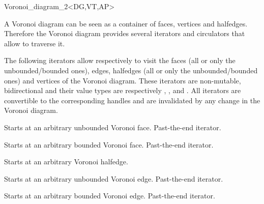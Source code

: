 \begin{ccRefClass}{Voronoi_diagram_2<DG,VT,AP>}


A Voronoi diagram can be seen as a container of faces, vertices and
halfedges. Therefore the Voronoi diagram provides several iterators
and circulators that allow to traverse it.





The following iterators allow respectively to visit the faces (all or
only the unbounded/bounded ones), edges, halfedges (all or only the
unbounded/bounded ones) and vertices of the Voronoi diagram. These
iterators are non-mutable, bidirectional and their 
value types are respectively , ,
 and . All iterators are convertible to the
corresponding handles and are invalidated by any change in the Voronoi
diagram.

\ccGlue
{}

{Starts at an arbitrary unbounded Voronoi face.}
\ccGlue
{}
{Past-the-end iterator.}

{Starts at an arbitrary bounded Voronoi face.}
\ccGlue
{}
{Past-the-end iterator.}

\ccGlue
{}

{Starts at an arbitrary Voronoi halfedge.}
\ccGlue
{}

{Starts at an arbitrary unbounded Voronoi edge.}
\ccGlue
{}
{Past-the-end iterator.}

{Starts at an arbitrary bounded Voronoi edge.}
\ccGlue
{}
{Past-the-end iterator.}


\end{ccRefClass}
